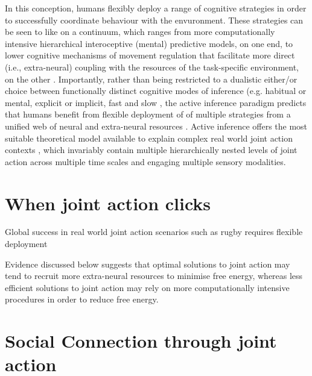 \begin{CJK}{UTF8}{gbsn}
In this conception, humans flexibly deploy a range of cognitive strategies in order to successfully coordinate behaviour with the envuronment.  These strategies can be seen to like on a continuum, which ranges from more computationally intensive hierarchical interoceptive (mental) predictive models, on one end, to lower cognitive mechanisms of movement regulation that facilitate more direct (i.e., extra-neural) coupling with the resources of the task-specific environment, on the other \citep{Riley2011}.  Importantly, rather than being restricted to a dualistic either/or choice between functionally distinct cognitive modes of inference (e.g. habitual or mental, explicit or implicit, fast and slow \citep[cf.][]{Dienes1999,Kahneman2011}, the active inference paradigm predicts that humans benefit from flexible deployment of of multiple strategies from a unified web of neural and extra-neural resources \citep{Pezzulo2013}.  Active inference offers the most suitable theoretical model available to explain complex real world joint action contexts \citep{Friston2015,Pesquita2017}, which invariably contain multiple hierarchically nested levels of joint action across multiple time scales and engaging multiple sensory modalities.


\section{When joint action clicks}

Global success in real world joint action scenarios such as rugby requires flexible deployment

Evidence discussed below suggests that optimal solutions to joint action may tend to recruit more extra-neural resources to minimise free energy, whereas less efficient solutions to joint action may rely on more computationally intensive procedures in order to reduce free energy.


























\section{Social Connection through joint action}


\end{CJK}
